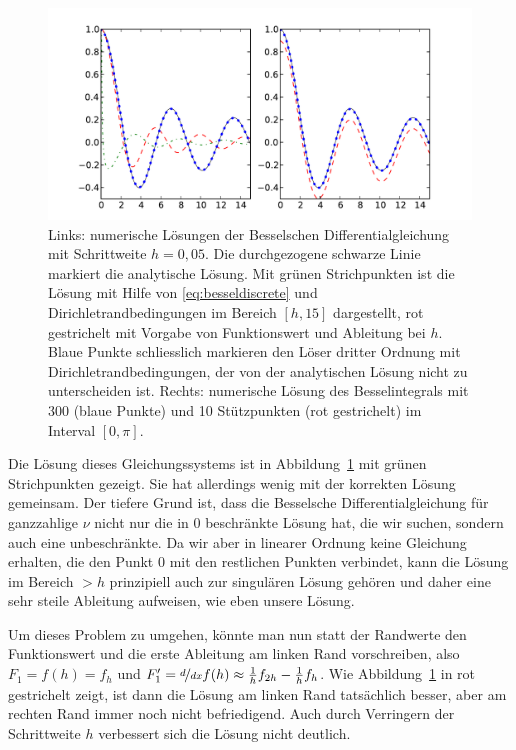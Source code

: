 \begin{figure}
  \centering
  \includegraphics[width=\textwidth]{plots/bessel}
  \caption{Links: numerische Lösungen der Besselschen
    Differentialgleichung mit Schrittweite $h=0,05$. Die durchgezogene
    schwarze Linie markiert die analytische Lösung. Mit grünen
    Strichpunkten ist die Lösung mit Hilfe von
    \eqref{eq:besseldiscrete} und Dirichletrandbedingungen im Bereich
    $[h, 15]$ dargestellt, rot gestrichelt mit Vorgabe von
    Funktionswert und Ableitung bei $h$. Blaue Punkte schliesslich
    markieren den Löser dritter Ordnung mit Dirichletrandbedingungen,
    der von der analytischen Lösung nicht zu unterscheiden
    ist. Rechts: numerische Lösung des Besselintegrals mit 300 (blaue
    Punkte) und 10 Stützpunkten (rot gestrichelt) im Interval
    $[0,\pi]$.}
  \label{fig:bessel}
\end{figure}

Die Lösung dieses Gleichungssystems ist in Abbildung~\ref{fig:bessel}
mit grünen Strichpunkten gezeigt. Sie hat allerdings wenig mit der
korrekten Lösung gemeinsam. Der tiefere Grund ist, dass die Besselsche
Differentialgleichung für ganzzahlige $\nu$ nicht nur die in $0$
beschränkte Lösung hat, die wir suchen, sondern auch eine
unbeschränkte. Da wir aber in linearer Ordnung keine Gleichung
erhalten, die den Punkt 0 mit den restlichen Punkten verbindet, kann
die Lösung im Bereich $>h$ prinzipiell auch zur singulären Lösung
gehören und daher eine sehr steile Ableitung aufweisen, wie eben
unsere Lösung.

Um dieses Problem zu umgehen, könnte man nun statt der Randwerte den
Funktionswert und die erste Ableitung am linken Rand vorschreiben,
also $F_1 = f(h) = f_h$ und $ F'_1 = \nicefrac{d}{dx}f(h) \approx
\frac{1}{h} f_{2h} - \frac{1}{h}f_h$.  Wie Abbildung~\ref{fig:bessel}
in rot gestrichelt zeigt, ist dann die Lösung am linken Rand
tatsächlich besser, aber am rechten Rand immer noch nicht
befriedigend. Auch durch Verringern der Schrittweite $h$ verbessert
sich die Lösung nicht deutlich.

